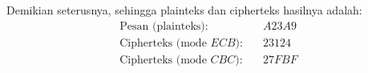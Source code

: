 \documentclass{article}
\begin{document}

Demikian seterusnya, sehingga plainteks dan cipherteks hasilnya adalah:
\begin{align*}
\text{Pesan (plainteks):} & \quad A23A9 \\
\text{Cipherteks (mode $ECB$):} & \quad 23124 \\
\text{Cipherteks (mode $CBC$):} & \quad 27FBF
\end{align*}
\end{document}
